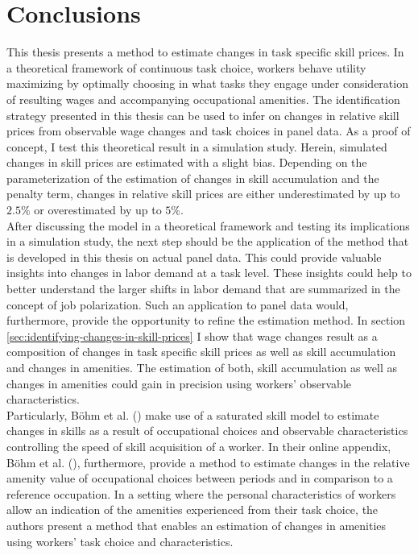 \documentclass[../main.tex]{subfiles}
\begin{document}
\section{Conclusions}
\label{sec:conclusions}
This thesis presents a method to estimate changes in task specific skill prices. In a theoretical framework of continuous task choice, workers behave utility maximizing by optimally choosing in what tasks they engage under consideration of resulting wages and accompanying occupational amenities. The identification strategy presented in this thesis can be used to infer on changes in relative skill prices from observable wage changes and task choices in panel data. As a proof of concept, I test this theoretical result in a simulation study. Herein, simulated changes in skill prices are estimated with a slight bias. Depending on the parameterization of the estimation of changes in skill accumulation and the penalty term, changes in relative skill prices are either underestimated by up to $2.5 \%$ or overestimated by up to $5 \%$.
\\
After discussing the model in a theoretical framework and testing its implications in a simulation study, the next step should be the application of the method that is developed in this thesis on actual panel data. This could provide valuable insights into changes in labor demand at a task level. These insights could help to better understand the larger shifts in labor demand that are summarized in the concept of job polarization. Such an application to panel data would, furthermore, provide the opportunity to refine the estimation method. In section \ref{sec:identifying-changes-in-skill-prices} I show that wage changes result as a composition of changes in task specific skill prices as well as skill accumulation and changes in amenities. The estimation of both, skill accumulation as well as changes in amenities could gain in precision using workers' observable characteristics.
\\
Particularly, Böhm et al. (\citeyear{bohm2019occupation}) make use of a saturated skill model to estimate changes in skills as a result of occupational choices and observable characteristics controlling the speed of skill acquisition of a worker. In their online appendix, Böhm et al. (\citeyear{bohm2019occupation}), furthermore, provide a method to estimate changes in the relative amenity value of occupational choices between periods and in comparison to a reference occupation. In a setting where the personal characteristics of workers allow an indication of the amenities experienced from their task choice, the authors present a method that enables an estimation of changes in amenities using workers' task choice and characteristics.
\end{document}
